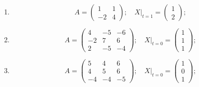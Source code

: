 \documentclass[a4paper, 12pt]{article}
\begin{document}
\begin{enumerate}
\item $$A = \begin{pmatrix}
	1 & 1\\
	-2 & 4
\end{pmatrix};\quad X|_{t=1} = \begin{pmatrix}
1\\2
\end{pmatrix};$$
\item $$A = \begin{pmatrix}
	4 & -5 & -6\\
	-2 & 7 & 6\\
	2 & -5 & -4
\end{pmatrix};\quad X|_{t=0} = \begin{pmatrix}
	1\\1\\1
\end{pmatrix};$$
\item $$A = \begin{pmatrix}
	5 & 4 & 6\\
	4 & 5 & 6\\
	-4 & -4 & -5
\end{pmatrix};\quad X|_{t=0} = \begin{pmatrix}
	1\\0\\1
\end{pmatrix};$$
 \end{enumerate}
\end{document}
